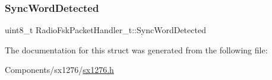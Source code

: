 \subsubsection{\texorpdfstring{Sync\+Word\+Detected}{SyncWordDetected}}
{\footnotesize\ttfamily uint8\+\_\+t Radio\+Fsk\+Packet\+Handler\+\_\+t\+::\+Sync\+Word\+Detected}



The documentation for this struct was generated from the following file\+:\begin{DoxyCompactItemize}
\item 
Components/sx1276/\hyperlink{sx1276_8h}{sx1276.\+h}\end{DoxyCompactItemize}
